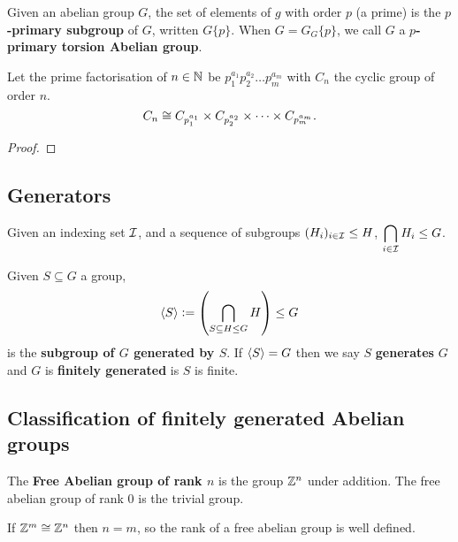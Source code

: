 \documentclass[../Year2.tex]{subfiles}
\begin{document}
\begin{definition}
    Given an abelian group $G$, the set of elements of $g$ with order $p$ (a prime) is the \textbf{$p$-primary subgroup} of $G$, written $G\{p\}$. When $G=G_G\{p\}$, we call $G$ a \textbf{$p$-primary torsion Abelian group}.
\end{definition}

\begin{theorem}
    Let the prime factorisation of $n\in\mathbb{N}$ be $p_1^{a_1}p_2^{a_2}\ldots p_m^{a_m}$ with $C_n$ the cyclic group of order $n$. \[
        C_n\cong C_{p_1^{a_1}}\times C_{p_2^{a_2}} \times \cdots \times C_{p_m^{a_m}}
    \text{\textcolor{black}{.}}
    \]
\vspace{-20pt}
    \begin{proof}
        
    \end{proof}
\end{theorem}

\subsection{Generators}

\begin{lemma}
    Given an indexing set $\mathcal{I}$, and a sequence of subgroups $(H_i)_{i\in\mathcal{I}}\leq H$, $\displaystyle \bigcap_{i\in\mathcal{I}}H_i\leq G$.
\end{lemma}

\begin{definition}
    Given $S\subseteq G$ a group,  \[
        \abr{S}:=\br{\bigcap_{S\subseteq H\leq G}H} \leq G
    \] is the \textbf{subgroup of $G$ generated by $S$}. If $\left\langle S \right\rangle=G$ then we say $S$ \textbf{generates} $G$ and $G$ is \textbf{finitely generated} is $S$ is finite.
\end{definition}

\subsection{Classification of finitely generated Abelian groups}
\begin{definition}
    The \textbf{Free Abelian group of rank $n$} is the group $\mathbb{Z}^n$ under addition. The free abelian group of rank 0 is the trivial group.
\end{definition}

\begin{lemma}
    If $\mathbb{Z}^m\cong\mathbb{Z}^n$ then $n=m$, so the rank of a free abelian group is well defined.
\end{lemma}
\end{document}
